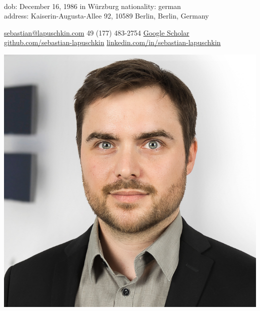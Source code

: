 \documentclass[10pt,a4paper]{article} %
\begin{document}

\noindent
\begin{minipage}{.8\textwidth}

\\
dob: December 16, 1986 in Würzburg  %
\bull
nationality: german \\
address: Kaiserin-Augusta-Allee 92, 10589 Berlin, Berlin, Germany %

\noindent\href{mailto:sebastian@lapuschkin.com}{sebastian@lapuschkin.com}\bull %
\textsmaller{+}49 (177) 483-2754\bull %
\href{https://scholar.google.com/citations?user=wpLQuroAAAAJ}{Google Scholar}
\\
\href{https://github.com/sebastian-lapuschkin}{github.com/sebastian-lapuschkin}\bull %
\href{https://www.linkedin.com/in/sebastian-lapuschkin}{linkedin.com/in/sebastian-lapuschkin} %
\end{minipage}
\begin{minipage}{.2\textwidth}
\includegraphics[width=\textwidth]{resources/mug-2021.jpg}
\end{minipage}
\end{document}
